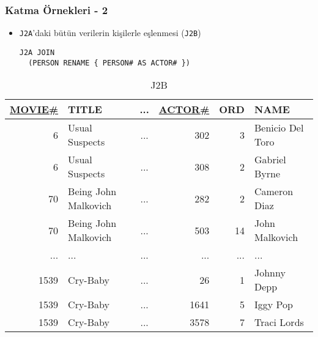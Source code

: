 \documentclass[dvipsnames]{beamer}
\theoremstyle{plain}
\begin{document}
\begin{frame}[fragile]
  \frametitle{Katma Örnekleri - 2}

    \begin{itemize}
      \item \texttt{J2A}'daki bütün verilerin kişilerle eşlenmesi (\texttt{J2B})

    \begin{lstlisting}
J2A JOIN
  (PERSON RENAME { PERSON# AS ACTOR# })
    \end{lstlisting}
     \end{itemize}

    \vspace{-10pt}
    \begin{tiny}
    \begin{table}
      \caption{J2B}
      \begin{tabular}{|r|l|c|r|r|l|}\hline
\underline{MOVIE\#} & TITLE & ... & \underline{ACTOR\#} & ORD & NAME\\[2pt]\hline\hline
   6 & Usual Suspects       & ... &     302 &   3 & Benicio Del Toro\\\hline
   6 & Usual Suspects       & ... &     308 &   2 & Gabriel Byrne   \\\hline
  70 & Being John Malkovich & ... &     282 &   2 & Cameron Diaz    \\\hline
  70 & Being John Malkovich & ... &     503 &  14 & John Malkovich  \\\hline
 ... & ...                  & ... &     ... & ... & ...             \\\hline
1539 & Cry-Baby             & ... &      26 &   1 & Johnny Depp     \\\hline
1539 & Cry-Baby             & ... &    1641 &   5 & Iggy Pop        \\\hline
1539 & Cry-Baby             & ... &    3578 &   7 & Traci Lords     \\\hline
      \end{tabular}
    \end{table}
    \end{tiny}
\end{frame}
\end{document}
